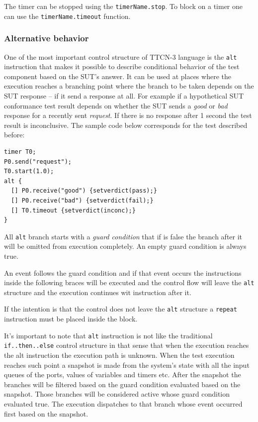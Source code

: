 \documentclass[a4paper]{article}
\begin{document}
The timer can be stopped using the \verb/timerName.stop/.
To block on a timer one can use the \verb!timerName.timeout! function.

\subsubsection{Alternative behavior}

One of the most important control structure of TTCN-3 language is the \verb.alt. instruction that
makes it possible to describe conditional behavior of the test component based on the SUT's answer.
It can be used at places where the execution reaches a branching point where the branch to be taken depends on the SUT
response -- if it send a response at all.
For example if a hypothetical SUT conformance test result depends on whether the SUT sends a \textit{good} or
\textit{bad} response for a recently sent \textit{request}. If there is no response after 1 second the test result is
inconclusive. The sample code below corresponds for the test described before:

{\footnotesize
\begin{lstlisting}
timer T0;
P0.send("request");
T0.start(1.0);
alt {
  [] P0.receive("good") {setverdict(pass);}
  [] P0.receive("bad") {setverdict(fail);}
  [] T0.timeout {setverdict(inconc);}
}
\end{lstlisting}
}

All \verb/alt/ branch starts with a \emph{guard condition} that if is false the branch after it will
be omitted from execution completely. An empty guard condition is always true.

An event follows the guard condition and if that event occurs the instructions inside the following braces will be
executed and the control flow will leave the \verb/alt/ structure and the execution continues wit
instruction after it.

If the intention is that the control does not leave the \verb/alt/ structure a
\verb/repeat/ instruction must be placed inside the block.

It's important to note that \verb/alt/ instruction is not like the traditional
\verb/if..then..else/ control structure in that sense that when the execution reaches the alt instruction the
execution path is unknown. When the test execution reaches such point a snapshot is made from the system's state with
all the input queues of the ports, values of variables and timers etc. After the snapshot the branches will be filtered
based on the guard condition evaluated based on the snapshot. Those branches will be considered active whose guard
condition evaluated true. The execution dispatches to that branch whose event occurred first based on the snapshot.
\end{document}
